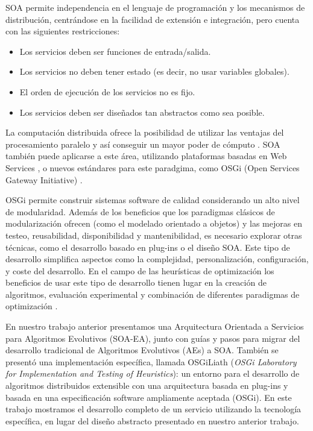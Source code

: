 \documentclass[runningheads]{llncs}
\begin{document}
SOA permite independencia en el lenguaje de programación y los mecanismos de distribución, centrándose en la facilidad de extensión e integración, pero cuenta con las siguientes restricciones:

\begin{itemize}
\item Los servicios deben ser funciones de entrada/salida.
\item Los servicios no deben tener estado (es decir, no usar variables globales).
\item El orden de ejecución de los servicios no es fijo.
\item Los servicios deben ser diseñados tan abstractos como sea posible.
\end{itemize}

La computación distribuida ofrece la posibilidad de utilizar las ventajas del procesamiento paralelo y así conseguir un mayor poder de cómputo \cite{OPENSCIENCEGRID}.
SOA también puede aplicarse a este área, utilizando plataformas basadas en Web Services \cite{PAPAZOGLOU}, o nuevos estándares para este paradgima, como OSGi (Open Services Gateway Initiative) \cite{OSGI}.

OSGi permite construir sistemas software de calidad considerando un alto nivel de modularidad. Además de los beneficios que los paradigmas clásicos de modularización ofrecen (como el modelado orientado a objetos) y las mejoras en testeo, reusabilidad, disponibilidad y mantenibilidad, es necesario explorar otras técnicas, como el desarrollo basado en plug-ins o el diseño SOA. Este tipo de desarrollo simplifica aspectos como la complejidad, personalización, configuración, y coste del desarrollo. En el campo de las heurísticas de optimización los beneficios de usar este tipo de desarrollo tienen lugar en la creación de algoritmos, evaluación experimental y combinación de diferentes paradigmas de optimización \cite{PLUGINS}.


En nuestro trabajo anterior \cite{OSGILIATH} presentamos una Arquitectura Orientada a Servicios para Algoritmos Evolutivos (SOA-EA), junto con guías y pasos para migrar del desarrollo tradicional de Algoritmos Evolutivos (AEs) a SOA. También se presentó una implementación específica, llamada OSGiLiath ({\em OSGi Laboratory for Implementation and Testing of Heuristics}): un entorno para el desarrollo de algoritmos distribuidos extensible con una arquitectura basada en plug-ins y basada en una especificación software ampliamente aceptada (OSGi). En este trabajo mostramos el desarrollo completo de un servicio utilizando la tecnología específica, en lugar del diseño abstracto presentado en nuestro anterior trabajo.
\end{document}

